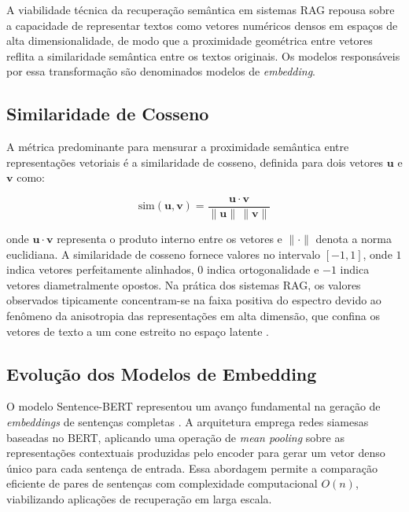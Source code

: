 \documentclass[
	12pt,				%
	openright,			%
	oneside,			%
	a4paper,			%
	tccpreliminar,		%
	]{ABNT-DC-UEL}
\begin{document}
A viabilidade técnica da recuperação semântica em sistemas RAG repousa sobre a capacidade de representar textos como vetores numéricos densos em espaços de alta dimensionalidade, de modo que a proximidade geométrica entre vetores reflita a similaridade semântica entre os textos originais. Os modelos responsáveis por essa transformação são denominados modelos de \textit{embedding}.

\subsection{Similaridade de Cosseno}

A métrica predominante para mensurar a proximidade semântica entre representações vetoriais é a similaridade de cosseno, definida para dois vetores $\mathbf{u}$ e $\mathbf{v}$ como:

\begin{equation}
\text{sim}(\mathbf{u}, \mathbf{v}) = \frac{\mathbf{u} \cdot \mathbf{v}}{\|\mathbf{u}\|\,\|\mathbf{v}\|}
\end{equation}

\noindent onde $\mathbf{u} \cdot \mathbf{v}$ representa o produto interno entre os vetores e $\|\cdot\|$ denota a norma euclidiana. A similaridade de cosseno fornece valores no intervalo $[-1, 1]$, onde $1$ indica vetores perfeitamente alinhados, $0$ indica ortogonalidade e $-1$ indica vetores diametralmente opostos. Na prática dos sistemas RAG, os valores observados tipicamente concentram-se na faixa positiva do espectro devido ao fenômeno da anisotropia das representações em alta dimensão, que confina os vetores de texto a um cone estreito no espaço latente \cite{ethayarajh2019contextual}.

\subsection{Evolução dos Modelos de Embedding}

O modelo Sentence-BERT representou um avanço fundamental na geração de \textit{embeddings} de sentenças completas \cite{reimers2019sentencebert}. A arquitetura emprega redes siamesas baseadas no BERT, aplicando uma operação de \textit{mean pooling} sobre as representações contextuais produzidas pelo encoder para gerar um vetor denso único para cada sentença de entrada. Essa abordagem permite a comparação eficiente de pares de sentenças com complexidade computacional $O(n)$, viabilizando aplicações de recuperação em larga escala.
\end{document}
